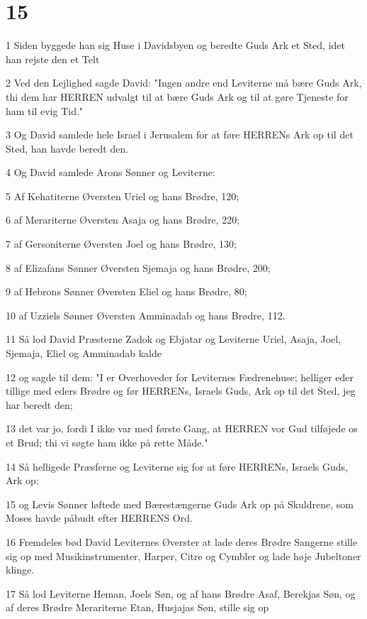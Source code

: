 \chapter{15}

\par 1 Siden byggede han sig Huse i Davidsbyen og beredte Guds Ark et Sted, idet han rejste den et Telt
\par 2 Ved den Lejlighed sagde David: "Ingen andre end Leviterne må bære Guds Ark, thi dem har HERREN udvalgt til at bære Guds Ark og til at gøre Tjeneste for ham til evig Tid."
\par 3 Og David samlede hele Israel i Jerusalem for at føre HERRENs Ark op til det Sted, han havde beredt den.
\par 4 Og David samlede Arons Sønner og Leviterne:
\par 5 Af Kehatiterne Øversten Uriel og hans Brødre, 120;
\par 6 af Merariterne Øversten Asaja og hans Brødre, 220;
\par 7 af Gersoniterne Øversten Joel og hans Brødre, 130;
\par 8 af Elizafans Sønner Øversten Sjemaja og hans Brødre, 200;
\par 9 af Hebrons Sønner Øversten Eliel og hans Brødre, 80;
\par 10 af Uzziels Sønner Øversten Amminadab og hans Brødre, 112.
\par 11 Så lod David Præsterne Zadok og Ebjatar og Leviterne Uriel, Asaja, Joel, Sjemaja, Eliel og Amminadab kalde
\par 12 og sagde til dem: "I er Overhoveder for Leviternes Fædrenehuse; helliger eder tillige med eders Brødre og før HERRENs, Israels Guds, Ark op til det Sted, jeg har beredt den;
\par 13 det var jo, fordi I ikke var med første Gang, at HERREN vor Gud tilføjede os et Brud; thi vi søgte ham ikke på rette Måde."
\par 14 Så helligede Præsferne og Leviterne sig for at føre HERRENs, Israels Guds, Ark op;
\par 15 og Levis Sønner løftede med Bærestængerne Guds Ark op på Skuldrene, som Moses havde påbudt efter HERRENS Ord.
\par 16 Fremdeles bød David Leviternes Øverster at lade deres Brødre Sangerne stille sig op med Musikinstrumenter, Harper, Citre og Cymbler og lade høje Jubeltoner klinge.
\par 17 Så lod Leviterne Heman, Joels Søn, og af hans Brødre Asaf, Berekjas Søn, og af deres Brødre Merariterne Etan, Husjajas Søn, stille sig op
